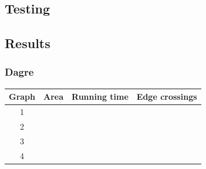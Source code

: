 \begin{landscape}

\section{Testing}



\subsection{Results}

\subsubsection{Dagre}

\begin{tabular}{ | c | c | c | c | }
    \hline
    Graph & Area & Running time & Edge crossings \\
    \hline
    1     & & & \\
    \hline
    2     & & & \\
    \hline
    3     & & & \\
    \hline
    4     & & & \\
    \hline
\end{tabular}



\end{landscape}

